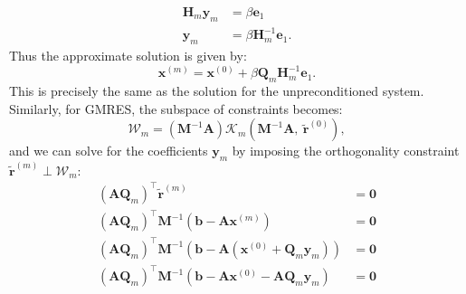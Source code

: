 \documentclass{article}
\begin{document}
\begin{appendix}
\begin{align*}
        \symbf{H}_m \symbf{y}_m                                                                                                                                        & = \beta \symbf{e}_1                   \\
        \symbf{y}_m                                                                                                                                                    & = \beta \symbf{H}_m^{-1} \symbf{e}_1.
    \end{align*}
    Thus the approximate solution is given by:
    \begin{equation*}
        \symbf{x}^{\left( m \right)} = \symbf{x}^{\left( 0 \right)} + \beta \symbf{Q}_m \symbf{H}_m^{-1} \symbf{e}_1.
    \end{equation*}
    This is precisely the same as the solution for the unpreconditioned
    system. Similarly, for GMRES, the subspace of constraints becomes:
    \begin{equation*}
        \mathcal{W}_m = \left( \symbf{M}^{-1} \symbf{A} \right) \mathcal{K}_m\left( \symbf{M}^{-1} \symbf{A},\: \tilde{\symbf{r}}^{\left( 0 \right)} \right),
    \end{equation*}
    and we can solve for the coefficients \(\symbf{y}_m\) by imposing the
    orthogonality constraint \(\tilde{\symbf{r}}^{\left( m \right)} \perp \mathcal{W}_m\):
    \begin{align*}
        \left( \symbf{A} \symbf{Q}_m \right)^\top \tilde{\symbf{r}}^{\left( m \right)}                                                                                                     & = \symbf{0}                                                                                             \\
        \left( \symbf{A} \symbf{Q}_m \right)^\top \symbf{M}^{-1} \left( \symbf{b} - \symbf{A} \symbf{x}^{\left( m \right)} \right)                                                         & = \symbf{0}                                                                                             \\
        \left( \symbf{A} \symbf{Q}_m \right)^\top \symbf{M}^{-1} \left( \symbf{b} - \symbf{A} \left( \symbf{x}^{\left( 0 \right)} + \symbf{Q}_m \symbf{y}_m \right) \right)                & = \symbf{0}                                                                                             \\
        \left( \symbf{A} \symbf{Q}_m \right)^\top \symbf{M}^{-1} \left( \symbf{b} - \symbf{A} \symbf{x}^{\left( 0 \right)} - \symbf{A} \symbf{Q}_m \symbf{y}_m \right)                     & = \symbf{0}                                                                                             \\

\end{align*}
\end{appendix}
\end{document}
